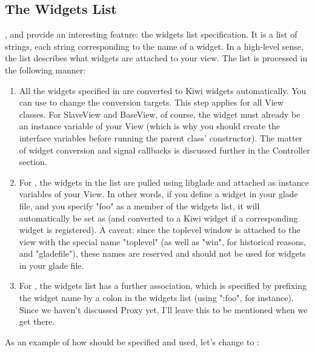 \documentclass[a4paper]{howto}
\begin{document}
\subsection{The Widgets List}

,  and  provide an
interesting feature: the widgets list specification. It is a list of
strings, each string corresponding to the name of a widget. In a
high-level sense, the list describes what widgets are attached to your
view. The list is processed in the following manner:

\begin{enumerate}
\item All the widgets specified in  are converted to
Kiwi widgets automatically. You can use 
to change the conversion targets. This step applies for all View
classes. For SlaveView and BaseView, of course, the widget must already
be an instance variable of your View (which is why you should create the
interface variables before running the parent class' constructor). The
matter of widget conversion and signal callbacks is discussed further
in the Controller section.

\item For , the widgets in the list are pulled using
libglade and attached as instance variables of your View. In other
words, if you define a widget  in your glade file, and you
specify "foo" as a member of the widgets list, it will automatically be
set as  (and converted to a Kiwi widget if a
corresponding widget is registered). A caveat: since the toplevel window
is attached to the view with the special name "toplevel" (as well as
"win", for historical reasons, and "gladefile"), these names are
reserved and should not be used for widgets in your glade file.

\item For , the widgets list has a further association,
which is specified by prefixing the widget name by a colon in the
widgets list (using ":foo", for instance). Since we haven't discussed
Proxy yet, I'll leave this to be mentioned when we get there.
\end{enumerate}

As an example of how  should be specified and used, let's
change  to :

\end{document}
